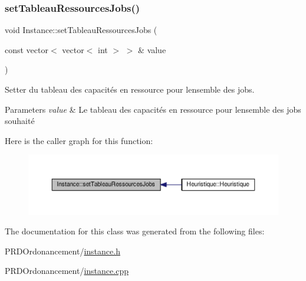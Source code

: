 \subsubsection{\texorpdfstring{set\+Tableau\+Ressources\+Jobs()}{setTableauRessourcesJobs()}}
{\footnotesize\ttfamily void Instance\+::set\+Tableau\+Ressources\+Jobs (\begin{DoxyParamCaption}\item[{const vector$<$ vector$<$ int $>$ $>$ \&}]{value }\end{DoxyParamCaption})}



Setter du tableau des capacités en ressource pour l\textquotesingle{}ensemble des jobs. 


\begin{DoxyParams}{Parameters}
{\em value} & Le tableau des capacités en ressource pour l\textquotesingle{}ensemble des jobs souhaité \\
\hline
\end{DoxyParams}
Here is the caller graph for this function\+:\nopagebreak
\begin{figure}[H]
\begin{center}
\leavevmode
\includegraphics[width=350pt]{classInstance_a4d3bf921882ce7809cc718200e9cf6e9_icgraph}
\end{center}
\end{figure}


The documentation for this class was generated from the following files\+:\begin{DoxyCompactItemize}
\item 
P\+R\+D\+Ordonancement/\hyperlink{instance_8h}{instance.\+h}\item 
P\+R\+D\+Ordonancement/\hyperlink{instance_8cpp}{instance.\+cpp}\end{DoxyCompactItemize}
